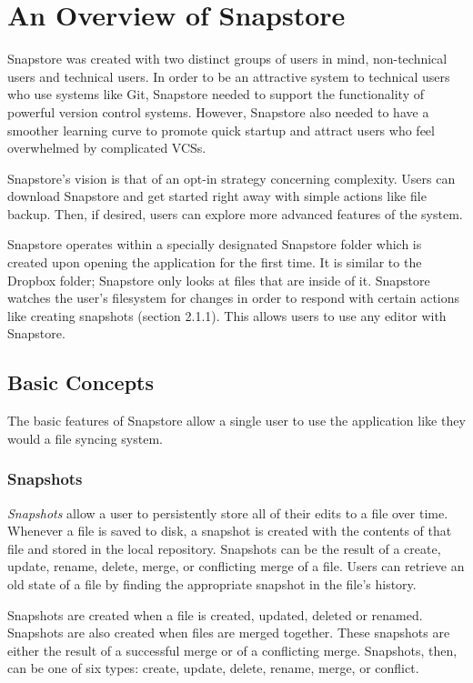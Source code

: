 \chapter{An Overview of Snapstore}

Snapstore was created with two distinct groups of users in mind, non-technical users and technical users. In order to be an attractive system to technical users who use systems like Git, Snapstore needed to support the functionality of powerful version control systems. However, Snapstore also needed to have a smoother learning curve to promote quick startup and attract users who feel overwhelmed by complicated VCSs. 

Snapstore's vision is that of an opt-in strategy concerning complexity. Users can download Snapstore and get started right away with simple actions like file backup. Then, if desired, users can explore more advanced features of the system.

Snapstore operates within a specially designated Snapstore folder which is created upon opening the application for the first time. It is similar to the Dropbox folder; Snapstore only looks at files that are inside of it. Snapstore watches the user's filesystem for changes in order to respond with certain actions like creating snapshots (section 2.1.1). This allows users to use any editor with Snapstore.

\section{Basic Concepts}

The basic features of Snapstore allow a single user to use the application like they would a file syncing system.

\subsection{Snapshots}

\textit{Snapshots} allow a user to persistently store all of their edits to a file over time. Whenever a file is saved to disk, a snapshot is created with the contents of that file and stored in the local repository. Snapshots can be the result of a create, update, rename, delete, merge, or conflicting merge of a file. Users can retrieve an old state of a file by finding the appropriate snapshot in the file's history.

Snapshots are created when a file is created, updated, deleted or renamed. Snapshots are also created when files are merged together. These snapshots are either the result of a successful merge or of a conflicting merge. Snapshots, then, can be one of six types: create, update, delete, rename, merge, or conflict.

